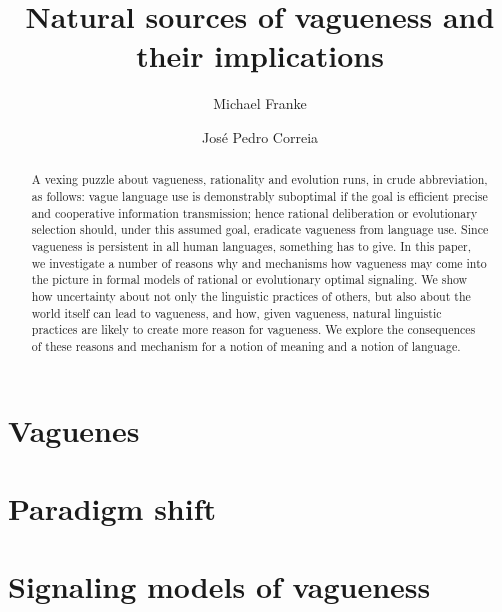 \documentclass{article}
\begin{document}
\title{Natural sources of vagueness and their implications}
\author{Michael Franke \and Jos\'e Pedro Correia}
\date{}

\maketitle

\begin{abstract}
A vexing puzzle about vagueness, rationality and evolution runs, in crude abbreviation, as follows: vague language use is demonstrably suboptimal if the goal is efficient precise and cooperative information transmission; hence rational deliberation or evolutionary selection should, under this assumed goal, eradicate vagueness from language use.
Since vagueness is persistent in all human languages, something has to give.
In this paper, we investigate a number of reasons why and mechanisms how vagueness may come into the picture in formal models of rational or evolutionary optimal signaling.
We show how uncertainty about not only the linguistic practices of others, but also about the world itself can lead to vagueness, and how, given vagueness, natural linguistic practices are likely to create more reason for vagueness.
We explore the consequences of these reasons and mechanism for a notion of meaning and a notion of language.
\end{abstract}

\tableofcontents

\section{Vaguenes}
\label{sec:vagueness}

\section{Paradigm shift}
\label{sec:Wittgenstein-and-signaling}

\section{Signaling models of vagueness}
\label{sec:vague-signaling}


\printbibliography
\end{document}
